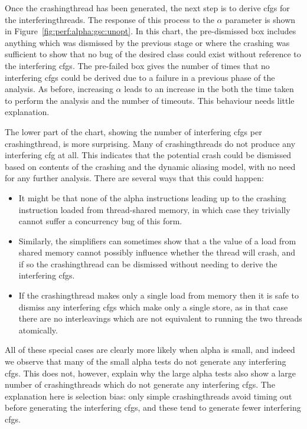 Once the \gls{crashingthread} {\StateMachine} has been generated, the
next step is to derive \glspl{cfg} for the \glspl{interferingthread}.
The response of this process to the $\alpha$ parameter is shown in
Figure~\ref{fig:perf:alpha:gsc:unopt}.  In this chart, the
pre-dismissed box includes anything which was dismissed by the
previous stage or where the crashing {\StateMachine} was sufficient to
show that no bug of the desired class could exist without reference to
the interfering \glspl{cfg}.  The pre-failed box gives the number of
times that no interfering \glspl{cfg} could be derived due to a
failure in a previous phase of the analysis.  As before, increasing
$\alpha$ leads to an increase in the both the time taken to perform
the analysis and the number of timeouts.  This behaviour needs little
explanation.

The lower part of the chart, showing the number of interfering
\glspl{cfg} per \gls{crashingthread}, is more surprising.  Many of
\glspl{crashingthread} do not produce any interfering \gls{cfg} at
all.  This indicates that the potential crash could be dismissed based
on contents of the crashing {\StateMachine} and the dynamic aliasing
model, with no need for any further analysis.  There are several ways
that this could happen:

\begin{itemize}
\item It might be that none of the \gls{alpha} instructions leading up
  to the crashing instruction loaded from thread-shared memory, in
  which case they trivially cannot suffer a concurrency bug of this
  form.
\item Similarly, the simplifiers can sometimes show that a the value
  of a load from shared memory cannot possibly influence whether the
  thread will crash, and if so the \gls{crashingthread} can be
  dismissed without needing to derive the interfering \glspl{cfg}.
\item If the \gls{crashingthread} makes only a single load from memory
  then it is safe to dismiss any interfering \glspl{cfg} which make
  only a single store, as in that case there are no interleavings
  which are not equivalent to running the two threads atomically.
\end{itemize}

All of these special cases are clearly more likely when \gls{alpha} is
small, and indeed we observe that many of the small \gls{alpha} tests
do not generate any interfering \glspl{cfg}.  This does not, however,
explain why the large \gls{alpha} tests also show a large number of
\glspl{crashingthread} which do not generate any interfering
\glspl{cfg}.  The explanation here is selection bias: only simple
\glspl{crashingthread} avoid timing out before generating the
interfering \glspl{cfg}, and these tend to generate fewer interfering
\glspl{cfg}.

